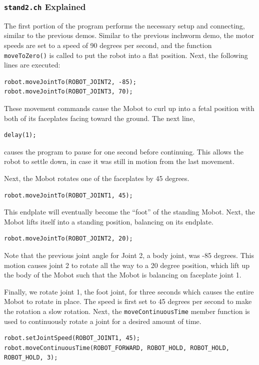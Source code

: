 \documentclass{article}
\begin{document}
\subsubsection{\texttt{stand2.ch} Explained}
The first portion of the program performs the necessary setup and connecting,
similar to the previous demos. Similar to the previous inchworm demo, the
motor speeds are set to a speed of 90 degrees per second, and the function \texttt{moveToZero()} is
called to put the robot into a flat position. Next, the following lines
are executed:
\begin{verbatim}
robot.moveJointTo(ROBOT_JOINT2, -85);
robot.moveJointTo(ROBOT_JOINT3, 70);
\end{verbatim}
These movement commands cause the Mobot to curl up into a fetal position with
both of its faceplates facing toward the ground. The next line, 

\begin{verbatim}
delay(1);
\end{verbatim}
causes the program to pause for one second before continuing. This allows the
robot to settle down, in case it was still in motion from the last movement.

Next, the Mobot rotates one 
of the faceplates by 45 degrees. 
\begin{verbatim}
robot.moveJointTo(ROBOT_JOINT1, 45);
\end{verbatim}
This endplate will eventually become the ``foot'' of the standing Mobot. Next,
the Mobot lifts itself into a standing position, balancing on its endplate.
\begin{verbatim}
robot.moveJointTo(ROBOT_JOINT2, 20);
\end{verbatim}
Note that the previous joint angle for Joint 2, a body joint, was -85 degrees. 
This motion causes joint 2 to rotate all the way to a 20 degree position, which
lift up the body of the Mobot such that the Mobot is balancing on faceplate joint 1.

Finally, we rotate joint 1, the foot joint, for three seconds which causes the
entire Mobot to rotate in place. The speed is first set to 45 degrees per second to make the
rotation a slow rotation. Next, the \texttt{moveContinuousTime} member function
is used to continuously rotate a joint for a desired amount of time.
\begin{verbatim}
robot.setJointSpeed(ROBOT_JOINT1, 45);
robot.moveContinuousTime(ROBOT_FORWARD, ROBOT_HOLD, ROBOT_HOLD, ROBOT_HOLD, 3);
\end{verbatim}
\end{document}
